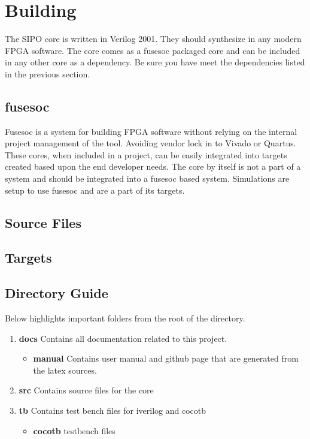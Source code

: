 \section{Building}

\par
The SIPO core is written in Verilog 2001. They should synthesize in any modern FPGA software. The core comes as a fusesoc packaged core and can be included in any other core as a dependency. Be sure you have meet the dependencies listed in the previous section.

\subsection{fusesoc}
\par
Fusesoc is a system for building FPGA software without relying on the internal project management of the tool. Avoiding vendor lock in to Vivado or Quartus.
These cores, when included in a project, can be easily integrated into targets created based upon the end developer needs. The core by itself is not a part of
a system and should be integrated into a fusesoc based system. Simulations are setup to use fusesoc and are a part of its targets.

\subsection{Source Files}



\subsection{Targets}



\subsection{Directory Guide}

\par
Below highlights important folders from the root of the directory.

\begin{enumerate}
  \item \textbf{docs} Contains all documentation related to this project.
    \begin{itemize}
      \item \textbf{manual} Contains user manual and github page that are generated from the latex sources.
    \end{itemize}
  \item \textbf{src} Contains source files for the core
  \item \textbf{tb} Contains test bench files for iverilog and cocotb
    \begin{itemize}
      \item \textbf{cocotb} testbench files
    \end{itemize}
\end{enumerate}

